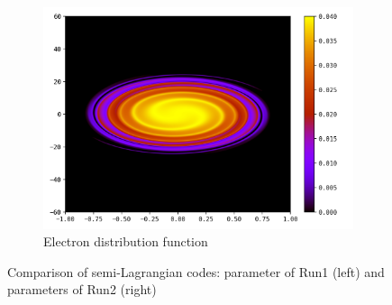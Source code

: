 \documentclass{article}
\numberwithin{equation}{section}
\newcommand{\imh}{\textheight} %
\newcommand{\imw}{\textwidth} %
\begin{document}
\begin{figure}
\begin{subfigure}{\textwidth}
		\includegraphics[height=\imh,width=\imw]{images/fe_run5ac.png}
		\caption{Electron distribution function}
	\end{subfigure}
	\caption{Comparison of semi-Lagrangian codes: parameter of Run1 (left) and parameters of Run2 (right) }
	\label{fig:comp_phasespace}
\end{figure}  
\end{document}

